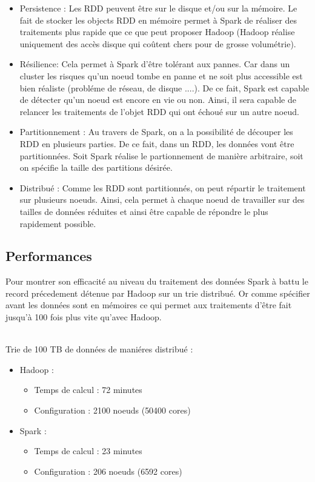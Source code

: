 \begin{itemize}
	\item Persistence : Les RDD peuvent être sur le disque et/ou sur la mémoire. Le fait de stocker les objects RDD en mémoire permet à Spark de réaliser des traitements plus rapide que ce que peut proposer Hadoop (Hadoop réalise uniquement des accès disque qui coûtent chers pour de grosse volumétrie).
	\item Résilience: Cela permet à Spark d'être tolérant aux pannes. Car dans un cluster les risques qu'un noeud tombe en panne et ne soit plus accessible est bien réaliste (probléme de réseau, de disque ....). De ce fait, Spark est capable de détecter qu'un noeud est encore en vie ou non. Ainsi, il sera capable de relancer les traitements de l'objet RDD qui ont échoué sur un autre noeud.
	\item Partitionnement : Au travers de Spark, on a la possibilité de découper les RDD en plusieurs parties. De ce fait, dans un RDD, les données vont être partitionnées. Soit Spark réalise le partionnement de manière arbitraire, soit on spécifie la taille des partitions désirée.
	\item Distribué : Comme les RDD sont partitionnés, on peut répartir le traitement sur plusieurs noeuds. Ainsi, cela permet à chaque noeud de travailler sur des tailles de données réduites et ainsi être capable de répondre le plus rapidement possible.
\end{itemize}

\subsection{Performances}

Pour montrer son efficacité au niveau du traitement des données Spark à battu le record précedement détenue par Hadoop sur un trie distribué. Or comme spécifier avant les données sont en mémoires ce qui permet aux traitements d'être fait jusqu'à 100 fois plus vite qu'avec Hadoop.

\ \\
Trie de 100 TB de données de maniéres distribué :
\ \\
\begin{itemize}
	\item Hadoop :
        \begin{itemize}
            \item Temps de calcul : 72 minutes
            \item Configuration : 2100 noeuds (50400 cores)
        \end{itemize}
	\item Spark :
		\begin{itemize}
        	\item Temps de calcul : 23 minutes
        	\item Configuration : 206 noeuds (6592 cores)
        \end{itemize}
\end{itemize}

